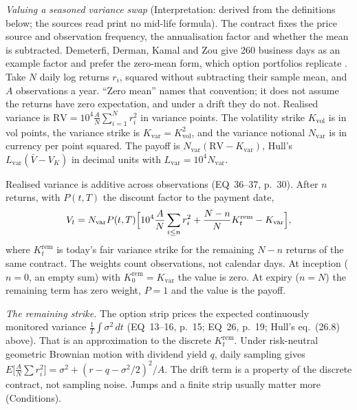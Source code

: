 \begin{qfmethod}
\emph{Valuing a seasoned variance swap} (Interpretation: derived from the definitions below; the sources read print no mid-life formula). The contract fixes the price source and observation frequency, the annualisation factor and whether the mean is subtracted. Demeterfi, Derman, Kamal and Zou give 260 business days as an example factor and prefer the zero-mean form, which option portfolios replicate \citep[pp.~1--2]{demeterfi-varswaps-gs-1999}. Take $N$ daily log returns $r_i$, squared without subtracting their sample mean, and $A$ observations a year. ``Zero mean'' names that convention; it does not assume the returns have zero expectation, and under a drift they do not. Realised variance is $\mathrm{RV}=10^4\frac AN\sum_{i=1}^Nr_i^2$ in variance points. The volatility strike $K_{\text{vol}}$ is in vol points, the variance strike is $K_{\text{var}}=K_{\text{vol}}^2$, and the variance notional $N_{\text{var}}$ is in currency per point squared. The payoff is $N_{\text{var}}(\mathrm{RV}-K_{\text{var}})$, Hull's $L_{\text{var}}(\bar V-V_K)$ in decimal units with $L_{\text{var}}=10^4N_{\text{var}}$.

Realised variance is additive across observations (EQ~36--37, p.~30). After $n$ returns, with $P(t,T)$ the discount factor to the payment date,
\[ V_t=N_{\text{var}}P(t,T)\Bigl[10^4\frac AN\sum_{i\le n}r_i^2+\frac{N-n}{N}K^{\text{rem}}_t-K_{\text{var}}\Bigr], \]
where $K^{\text{rem}}_t$ is today's fair variance strike for the remaining $N-n$ returns of the same contract. The weights count observations, not calendar days. At inception ($n=0$, an empty sum) with $K^{\text{rem}}_0=K_{\text{var}}$ the value is zero. At expiry ($n=N$) the remaining term has zero weight, $P=1$ and the value is the payoff.

\emph{The remaining strike.} The option strip prices the expected continuously monitored variance $\frac1T\int\sigma^2\,dt$ (EQ~13--16, p.~15; EQ~26, p.~19; Hull's eq.~(26.8) above). That is an approximation to the discrete $K^{\text{rem}}_t$. Under risk-neutral geometric Brownian motion with dividend yield $q$, daily sampling gives $E\bigl[\frac AN\sum r_i^2\bigr]=\sigma^2+(r-q-\sigma^2/2)^2/A$. The drift term is a property of the discrete contract, not sampling noise. Jumps and a finite strip usually matter more (Conditions).


\end{qfmethod}
